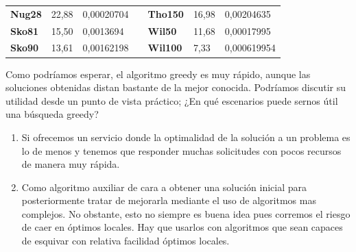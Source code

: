 \documentclass[a4paper, 12pt]{article}
\begin{document}
\begin{table}[H]
\begin{tabular}{|l|l|l|l|l|l|l|}
\textbf{Nug28}   & 22,88                              & 0,00020704                           &  & \textbf{Tho150}  & 16,98                              & 0,00204635                           \\ \cline{1-3} \cline{5-7} 
\textbf{Sko81}   & 15,50                              & 0,0013694                            &  & \textbf{Wil50}   & 11,68                              & 0,00017995                           \\ \cline{1-3} \cline{5-7} 
\textbf{Sko90}   & 13,61                              & 0,00162198                           &  & \textbf{Wil100}  & 7,33                               & 0,000619954                          \\ \cline{1-3} \cline{5-7} 
\end{tabular}
\end{table}

      Como podríamos esperar, el algoritmo greedy es muy rápido, aunque las soluciones obtenidas distan bastante de la mejor conocida. Podríamos discutir su utilidad desde un punto de vista práctico; ¿En qué escenarios puede sernos útil una búsqueda greedy?
      
      \begin{enumerate}
         \item Si ofrecemos un servicio donde la optimalidad de la solución a un problema es lo de menos y tenemos que responder muchas solicitudes con pocos recursos de manera muy rápida.
         
         \item Como algoritmo auxiliar de cara a obtener una solución inicial para posteriormente tratar de mejorarla mediante el uso de algoritmos mas complejos. No obstante, esto no siempre es buena idea pues corremos el riesgo de caer en óptimos locales. Hay que usarlos con algoritmos que sean capaces de esquivar con relativa facilidad óptimos locales.         
      \end{enumerate}
      
\end{document}

